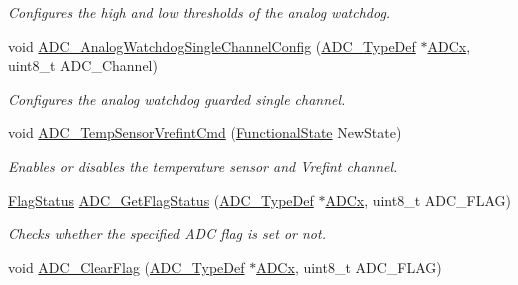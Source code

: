 \begin{DoxyCompactItemize}
\begin{DoxyCompactList}\small\item\em Configures the high and low thresholds of the analog watchdog. \end{DoxyCompactList}\item 
void \mbox{\hyperlink{group___a_d_c___private___functions_ga03cef3d12292ffa2b8520524d5b0226c}{A\+D\+C\+\_\+\+Analog\+Watchdog\+Single\+Channel\+Config}} (\mbox{\hyperlink{struct_a_d_c___type_def}{A\+D\+C\+\_\+\+Type\+Def}} $\ast$\mbox{\hyperlink{group___s_t_m32_f1_x_x___n_u_c_l_e_o___l_o_w___l_e_v_e_l___exported___constants_gab44c1065d38c298955fc028346984340}{A\+D\+Cx}}, uint8\+\_\+t A\+D\+C\+\_\+\+Channel)
\begin{DoxyCompactList}\small\item\em Configures the analog watchdog guarded single channel. \end{DoxyCompactList}\item 
void \mbox{\hyperlink{group___a_d_c___private___functions_ga848682e2d7d3de9f8cf03ffa4c11f0b5}{A\+D\+C\+\_\+\+Temp\+Sensor\+Vrefint\+Cmd}} (\mbox{\hyperlink{group___exported__types_gac9a7e9a35d2513ec15c3b537aaa4fba1}{Functional\+State}} New\+State)
\begin{DoxyCompactList}\small\item\em Enables or disables the temperature sensor and Vrefint channel. \end{DoxyCompactList}\item 
\mbox{\hyperlink{group___exported__types_ga89136caac2e14c55151f527ac02daaff}{Flag\+Status}} \mbox{\hyperlink{group___a_d_c___private___functions_gaa12546e51ec905c90a3aada432bd4633}{A\+D\+C\+\_\+\+Get\+Flag\+Status}} (\mbox{\hyperlink{struct_a_d_c___type_def}{A\+D\+C\+\_\+\+Type\+Def}} $\ast$\mbox{\hyperlink{group___s_t_m32_f1_x_x___n_u_c_l_e_o___l_o_w___l_e_v_e_l___exported___constants_gab44c1065d38c298955fc028346984340}{A\+D\+Cx}}, uint8\+\_\+t A\+D\+C\+\_\+\+F\+L\+AG)
\begin{DoxyCompactList}\small\item\em Checks whether the specified A\+DC flag is set or not. \end{DoxyCompactList}\item 
void \mbox{\hyperlink{group___a_d_c___private___functions_gaf34f36798f811b4a41321ea2d12118d4}{A\+D\+C\+\_\+\+Clear\+Flag}} (\mbox{\hyperlink{struct_a_d_c___type_def}{A\+D\+C\+\_\+\+Type\+Def}} $\ast$\mbox{\hyperlink{group___s_t_m32_f1_x_x___n_u_c_l_e_o___l_o_w___l_e_v_e_l___exported___constants_gab44c1065d38c298955fc028346984340}{A\+D\+Cx}}, uint8\+\_\+t A\+D\+C\+\_\+\+F\+L\+AG)

\end{DoxyCompactItemize}
